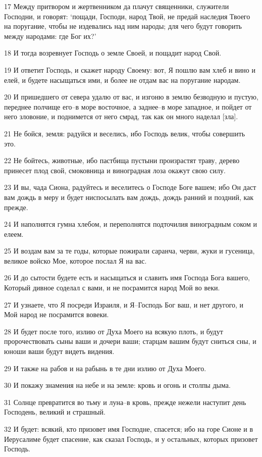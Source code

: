 \par 17 Между притвором и жертвенником да плачут священники, служители Господни, и говорят: `пощади, Господи, народ Твой, не предай наследия Твоего на поругание, чтобы не издевались над ним народы; для чего будут говорить между народами: где Бог их?'
\par 18 И тогда возревнует Господь о земле Своей, и пощадит народ Свой.
\par 19 И ответит Господь, и скажет народу Своему: вот, Я пошлю вам хлеб и вино и елей, и будете насыщаться ими, и более не отдам вас на поругание народам.
\par 20 И пришедшего от севера удалю от вас, и изгоню в землю безводную и пустую, переднее полчище его--в море восточное, а заднее--в море западное, и пойдет от него зловоние, и поднимется от него смрад, так как он много наделал [зла].
\par 21 Не бойся, земля: радуйся и веселись, ибо Господь велик, чтобы совершить это.
\par 22 Не бойтесь, животные, ибо пастбища пустыни произрастят траву, дерево принесет плод свой, смоковница и виноградная лоза окажут свою силу.
\par 23 И вы, чада Сиона, радуйтесь и веселитесь о Господе Боге вашем; ибо Он даст вам дождь в меру и будет ниспосылать вам дождь, дождь ранний и поздний, как прежде.
\par 24 И наполнятся гумна хлебом, и переполнятся подточилия виноградным соком и елеем.
\par 25 И воздам вам за те годы, которые пожирали саранча, черви, жуки и гусеница, великое войско Мое, которое послал Я на вас.
\par 26 И до сытости будете есть и насыщаться и славить имя Господа Бога вашего, Который дивное соделал с вами, и не посрамится народ Мой во веки.
\par 27 И узнаете, что Я посреди Израиля, и Я--Господь Бог ваш, и нет другого, и Мой народ не посрамится вовеки.
\par 28 И будет после того, излию от Духа Моего на всякую плоть, и будут пророчествовать сыны ваши и дочери ваши; старцам вашим будут сниться сны, и юноши ваши будут видеть видения.
\par 29 И также на рабов и на рабынь в те дни излию от Духа Моего.
\par 30 И покажу знамения на небе и на земле: кровь и огонь и столпы дыма.
\par 31 Солнце превратится во тьму и луна--в кровь, прежде нежели наступит день Господень, великий и страшный.
\par 32 И будет: всякий, кто призовет имя Господне, спасется; ибо на горе Сионе и в Иерусалиме будет спасение, как сказал Господь, и у остальных, которых призовет Господь.

